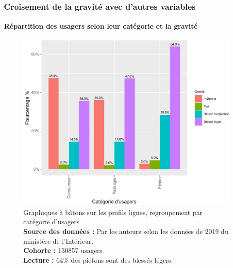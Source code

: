 \documentclass[french,]{tp}
\let\oldparagraph\paragraph
\renewcommand{\paragraph}[1]{\oldparagraph{#1}\mbox{}}
\begin{document}
\newpage

\hypertarget{croisement-de-la-gravituxe9-avec-dautres-variables}{%
\subsubsection{Croisement de la gravité avec d'autres variables}\label{croisement-de-la-gravituxe9-avec-dautres-variables}}

\hypertarget{ruxe9partition-des-usagers-selon-leur-catuxe9gorie-et-la-gravituxe9}{%
\paragraph{Répartition des usagers selon leur catégorie et la gravité}\label{ruxe9partition-des-usagers-selon-leur-catuxe9gorie-et-la-gravituxe9}}






\begin{figure}[ht!]

{\centering \includegraphics{Prediction_Gravite_files/figure-latex/barplotcatu-1} 

}

\caption{Graphiques à bâtons sur les profils lignes, regroupement par catégorie d'usagers\\
\textbf{Source des données :} Par les auteurs selon les données de 2019 du ministère de l'Intérieur.\\
\textbf{Cohorte :} 130857 usagers.\\
\textbf{Lecture :} 64\% des piétons sont des blessés légers.}\label{fig:barplotcatu}
\end{figure}
\end{document}
